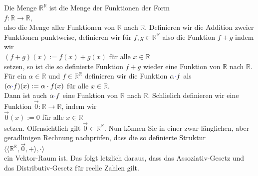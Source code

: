 \example
Die Menge $\mathbb{R}^{\mathbb{R}}$ ist die Menge der Funktionen der Form
\\[0.2cm]
\hspace*{1.3cm}
 $f: \mathbb{R} \rightarrow \mathbb{R}$,
\\[0.2cm]
also die Menge aller Funktionen von $\mathbb{R}$ nach $\mathbb{R}$.
Definieren wir die Addition zweier Funktionen punktweise, definieren wir f\"{u}r $f,g \in \mathbb{R}^{\mathbb{R}}$ also die
Funktion $f+g$ indem wir
\\[0.2cm]
\hspace*{1.3cm}
$(f+g)(x) := f(x) + g(x)$  \quad f\"ur alle $x \in \mathbb{R}$
\\[0.2cm]
setzen, so ist die so definierte Funktion $f + g$ wieder eine Funktion von
$\mathbb{R}$ nach $\mathbb{R}$.  F\"{u}r ein $\alpha \in \mathbb{R}$ und $f
\in\mathbb{R}^{\mathbb{R}}$ definieren wir die Funktion
$\alpha {\color{blue}{\cdot}} f$ als
\\[0.2cm]
\hspace*{1.3cm}
$(\alpha {\color{blue}{\cdot}} f)(x) := \alpha \cdot f(x)$ \quad f\"ur alle $x \in \mathbb{R}$.
\\[0.2cm]
Dann ist auch  $\alpha {\color{blue}{\cdot}} f$ eine Funktion von $\mathbb{R}$ nach $\mathbb{R}$.  
Schlie\3lich definieren wir eine Funktion
 $\vec{0}:\mathbb{R} \rightarrow \mathbb{R}$, indem wir
\\[0.2cm]
\hspace*{1.3cm}
$\vec{0}(x) := 0$ \quad f\"ur alle $x \in \mathbb{R}$ 
\\[0.2cm]
setzen.  Offensichtlich  gilt $\vec{0} \in \mathbb{R}^{\mathbb{R}}$.  Nun k\"{o}nnen Sie
in einer zwar l\"{a}nglichen, aber geradlinigen Rechnung nachpr\"{u}fen, dass die so definierte Struktur
\\[0.2cm]
\hspace*{1.3cm}
$\bigl\langle \langle \mathbb{R}^{\mathbb{R}}, \vec{0}, + \rangle, \cdot \bigr\rangle$
\\[0.2cm]
ein Vektor-Raum ist.  Das folgt letzlich daraus, dass das Assoziativ-Gesetz und das Distributiv-Gesetz f\"{u}r reelle Zahlen
gilt.
 \eoxs

